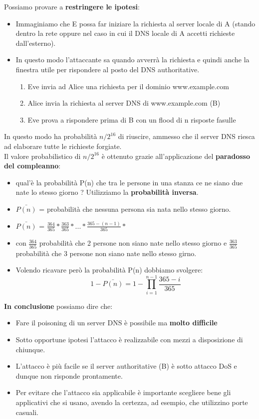 \documentclass[12pt]{article}
\begin{document}
				Possiamo provare a \textbf{restringere le ipotesi}: 
				\begin{itemize}
					\item Immaginiamo che E possa far iniziare la richiesta al server locale di A (stando dentro la rete oppure nel caso in cui il DNS locale di A accetti richieste dall'esterno).
					\item In questo modo l'attaccante sa quando avverrà la richiesta e quindi anche la finestra utile per rispondere al posto del DNS authoritative.
					\begin{enumerate}
						\item Eve invia ad Alice una richiesta per il dominio www.example.com
						\item Alice invia la richiesta al server DNS di www.example.com (B)
						\item Eve prova a rispondere prima di B con un flood di n risposte fasulle
					\end{enumerate}
				\end{itemize}
				In questo modo ha probabilità $n/2^{16}$ di riuscire, ammesso che il server DNS riesca ad elaborare tutte le richieste forgiate.\\
				
				Il valore probabilistico di $n/2^16$ è ottenuto grazie all'applicazione del \textbf{paradosso del compleanno}:
				\begin{itemize}
					\item qual'è la probabilità P(n) che tra le persone in una stanza ce ne siano due nate lo stesso giorno ? Utilizziamo la \textbf{probabilità inversa}.
					\item $\bar{P(n)}$ = probabilità che nessuna persona sia nata nello stesso giorno.
					\item $\bar{P(n)}$ = $\frac{364}{365}*\frac{363}{365}*...* \frac{365-(n-1)}{365}*  $
					\item con $\frac{364}{365}$ probabilità che 2 persone non siano nate nello stesso giorno e $\frac{363}{365}$ probabilità che 3 persone non siano nate nello stesso girno.
					\item Volendo ricavare però la probabilità P(n) dobbiamo svolgere:
					$$1-\bar{P(n)} = 1- \prod_{i=1}^{n-1} \frac{365-i}{365} $$
				\end{itemize}
				
				\textbf{In conclusione} possiamo dire che:
				\begin{itemize}
					\item Fare il poisoning di un server DNS è possibile ma \textbf{molto difficile}
					\item Sotto opportune ipotesi l'attacco è realizzabile con mezzi a disposizione di chiunque.
					\item L'attacco è più facile se il server authoritative (B) è sotto attacco DoS e dunque non risponde prontamente.
					\item Per evitare che l'attacco sia applicabile è importante scegliere bene gli applicativi che si usano, avendo la certezza, ad esempio, che utilizzino porte casuali.
				\end{itemize}
\end{document}
